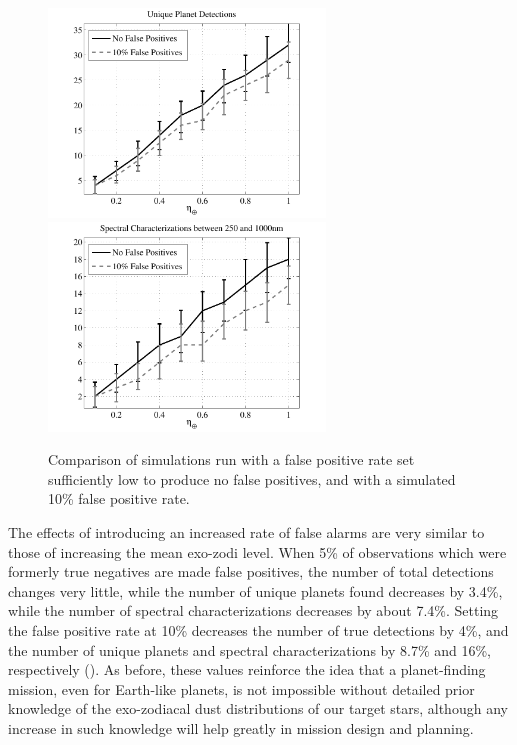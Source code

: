 \begin{figure}[ht]
 \begin{center}
   \includegraphics[width=2.9in,clip=true,trim=0.25in 0in 0.5in 0.05in]{./figures/AuDETs_zFA}
   \includegraphics[width=2.9in,clip=true,trim=0.25in 0in 0.5in 0.05in]{./figures/ASPECTRA_zFA}
 \end{center}
 \caption[Effects of varying false positive rates.]{ \label{fig:varFA} Comparison of simulations  run with a false positive rate set sufficiently low to produce no false positives, and with a simulated 10\% false positive rate.}
 \end{figure}
The effects of introducing an increased rate of false alarms are very similar to those of increasing the mean exo-zodi level.  When 5\% of observations which were formerly true negatives are made false positives, the number of total detections changes very little, while the number of unique planets found decreases by 3.4\%, while the number of spectral characterizations decreases by about 7.4\%.  Setting the false positive rate at 10\% decreases the number of true detections by 4\%, and the number of unique planets and spectral characterizations by 8.7\% and 16\%, respectively ().  As before, these values reinforce the idea that a planet-finding mission, even for Earth-like planets, is not impossible without detailed prior knowledge of the exo-zodiacal dust distributions of our target stars, although any increase in such knowledge will help greatly in mission design and planning.  

